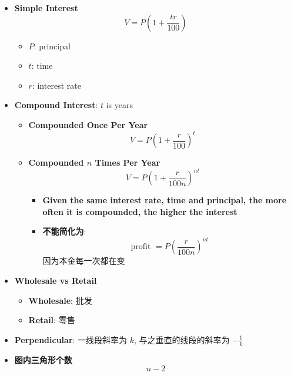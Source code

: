 \begin{multicols}{2}
\begin{itemize}
    \item \textbf{Simple Interest}
    \begin{equation}
      V = P \left( 1 + \frac{tr}{100} \right)
    \end{equation}

    \begin{itemize}
      \item $ P $: principal
      \item $ t $: time
      \item $ r $: interest rate
    \end{itemize}

    \item \textbf{Compound Interest}: $ t $ is years
    \begin{itemize}
      \item \textbf{Compounded Once Per Year}
      \begin{equation}
        V = P \left( 1 + \frac{r}{100} \right)^{t}
      \end{equation}

      \item \textbf{Compounded $ n $ Times Per Year}
      \begin{equation}
        V = P \left( 1 + \frac{r}{100n} \right)^{nt}
      \end{equation}
      \begin{itemize}
        \item \textbf{Given the same interest rate, time and principal, the more
        often it is compounded, the higher the interest}
        \item \textbf{不能简化为}:
        \begin{equation}
          \text{profit } = P \left( \frac{r}{100n} \right)^{nt}
        \end{equation}
        因为本金每一次都在变
      \end{itemize}
    \end{itemize}

    \item \textbf{Wholesale vs Retail}
    \begin{itemize}
      \item \textbf{Wholesale}: 批发
      \item \textbf{Retail}: 零售
    \end{itemize}

    \item \textbf{Perpendicular}: 一线段斜率为 $ k $, 与之垂直的线段的斜率为
    $ -\frac{1}{k} $
    \item \textbf{图内三角形个数}
    \begin{equation}
      n - 2
    \end{equation}


\end{itemize}
\end{multicols}
